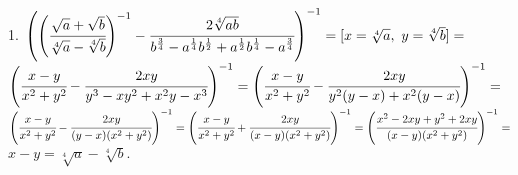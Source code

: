 1. $\left(\left(\cfrac{\sqrt{a}+\sqrt{b}}{\sqrt[4]{a}-\sqrt[4]{b}}\right)^{-1}-
\cfrac{2\sqrt[4]{ab}}{b^{\frac{3}{4}}-a^{\frac{1}{4}}b^{\frac{1}{2}}+
a^{\frac{1}{2}}b^{\frac{1}{4}}-a^{\frac{3}{4}}}\right)^{-1}=[x=\sqrt[4]{a},\ y=\sqrt[4]{b}]=$\\$
\left(\cfrac{x-y}{x^2+y^2}-\cfrac{2xy}{y^3-xy^2+x^2y-x^3}\right)^{-1}=
\left(\cfrac{x-y}{x^2+y^2}-\cfrac{2xy}{y^2(y-x)+x^2(y-x)}\right)^{-1}=$\\$
\left(\cfrac{x-y}{x^2+y^2}-\cfrac{2xy}{(y-x)(x^2+y^2)}\right)^{-1}=
\left(\cfrac{x-y}{x^2+y^2}+\cfrac{2xy}{(x-y)(x^2+y^2)}\right)^{-1}=
\left(\cfrac{x^2-2xy+y^2+2xy}{(x-y)(x^2+y^2)}\right)^{-1}=$\\$x-y=\sqrt[4]{a}-\sqrt[4]{b}.$\\
